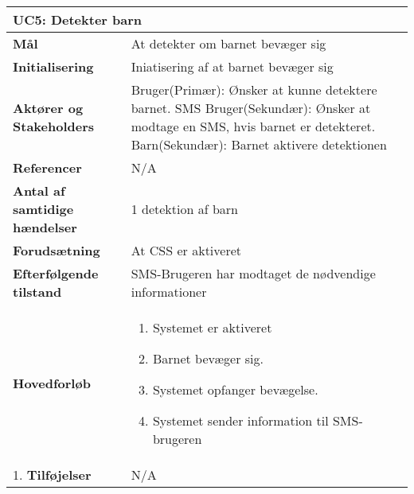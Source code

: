 \begin{table}[H] \centering
\begin{tabular}{|p{6cm}|p{8cm}|}
	\hline
\multicolumn{2}{|l|}{\textbf{UC5: Detekter barn}} \\\hline
\textbf{Mål}								&At detekter om barnet bevæger sig \\\hline
\textbf{Initialisering}					&Iniatisering af at barnet bevæger sig \\\hline
\textbf{Aktører og Stakeholders}			&Bruger(Primær): Ønsker at kunne detektere barnet. SMS Bruger(Sekundær): 																	Ønsker at modtage en SMS, hvis barnet er detekteret. Barn(Sekundær): Barnet aktivere detektionen 				 \\\hline
\textbf{Referencer}						&N/A \\\hline
\textbf{Antal af samtidige hændelser}	&1 detektion af barn \\\hline
\textbf{Forudsætning}					&At CSS er aktiveret \\\hline
\textbf{Efterfølgende tilstand}			&SMS-Brugeren har modtaget de nødvendige informationer \\\hline
\textbf{Hovedforløb}					&\begin{enumerate}
	
				\item Systemet er aktiveret
										
				\item Barnet bevæger sig.
												
				\item Systemet opfanger bevægelse.
												
				\item Systemet sender information til SMS-brugeren
					
												
			\end{enumerate}\\\hline1.
\textbf{Tilføjelser}					&N/A \\\hline
	\end{tabular}
	\label{UC5} 
\end{table}